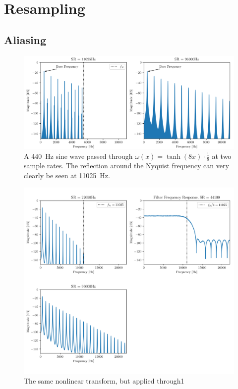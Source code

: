 \chapter{Resampling}

\section{Aliasing}

\begin{figure}[H]
  \centering
  \label{fig:aliasing_example}
  \includegraphics[width=\textwidth]{Pictures/aliasing_example.png}
  \caption{A \SI{440}{Hz} sine wave passed through $\omega(x) = \tanh(8x) \cdot\frac{1}{8}$ at two sample rates. The reflection
    around the Nyquist frequency can very clearly be seen at \SI{11025}{Hz}.}
\end{figure}

\begin{figure}[H]
  \centering
  \label{fig:resampled_tanh}
  \includegraphics[width=\textwidth]{Pictures/resampled_tanh.png}
  \caption{The same nonlinear transform, but applied through1}
\end{figure}

